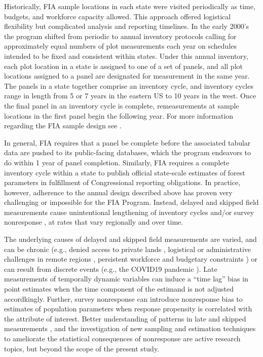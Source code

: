 \documentclass[
  number]{elsarticle}
\begin{document}
Historically, FIA sample locations in each state were visited
periodically as time, budgets, and workforce capacity allowed. This
approach offered logistical flexibility but complicated analysis and
reporting timelines. In the early 2000's the program shifted from
periodic to annual inventory protocols calling for approximately equal
numbers of plot measurements each year on schedules intended to be fixed
and consistent within states. Under this annual inventory, each plot
location in a state is assigned to one of a set of panels, and all plot
locations assigned to a panel are designated for measurement in the same
year. The panels in a state together comprise an inventory cycle, and
inventory cycles range in length from 5 or 7 years in the eastern US to
10 years in the west. Once the final panel in an inventory cycle is
complete, remeasurements at sample locations in the first panel begin
the following year. For more information regarding the FIA sample design
see \citep[ Chapter 2]{gb1, gb2}.

In general, FIA requires that a panel be complete before the associated
tabular data are pushed to its public-facing databases, which the
program endeavors to do within 1 year of panel completion. Similarly,
FIA requires a complete inventory cycle within a state to publish
official state-scale estimates of forest parameters in fulfillment of
Congressional reporting obligations. In practice, however, adherence to
the annual design described above has proven very challenging or
impossible for the FIA Program. Instead, delayed and skipped field
measurements cause unintentional lengthening of inventory cycles and/or
survey nonresponse \citep[see, e.g.,][]{sarndal_nonresponse}, at rates
that vary regionally and over time.

The underlying causes of delayed and skipped field measurements are
varied, and can be chronic (e.g., denied access to private lands
\citep{westfall2022spatial}, logistical or administrative challenges in
remote regions \citep{affleck2026inventory}, persistent workforce and
budgetary constraints \citep{conroy_thesis}) or can result from discrete
events (e.g., the COVID19 pandemic \citep{covid}). Late measurements of
temporally dynamic variables can induce a ``time lag'' bias in point
estimates when the time component of the estimand is not adjusted
accordkingly. Further, survey nonresponse can introduce nonresponse bias
to estimates of population parameters when response propensity is
correlated with the attribute of interest. Better understanding of
patterns in late and skipped measurements \citep{conroy_thesis}, and the
investigation of new sampling and estimation techniques to ameliorate
the statistical consequences of nonresponse
\citep{westfall2022estimation, westfall2026double} are active research
topics, but beyond the scope of the present study.
\end{document}
